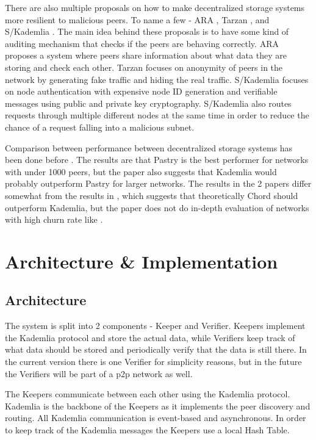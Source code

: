 \documentclass[ twoside,openright,titlepage,numbers=noenddot,headinclude,%
                footinclude=true,cleardoublepage=empty,abstractoff, %
                BCOR=5mm,paper=a4,fontsize=11pt,%
                ngerman,american,%
                ]{scrreprt}
\begin{document}
There are also multiple proposals on how to make decentralized storage systems more resilient to malicious peers.
To name a few - ARA \cite{ara}, Tarzan \cite{tarzan}, and S/Kademlia \cite{skademlia}.
The main idea behind these proposals is to have some kind of auditing mechanism that checks if the peers are behaving correctly.
ARA proposes a system where peers share information about what data they are storing and check each other.
Tarzan focuses on anonymity of peers in the network by generating fake traffic and hiding the real traffic.
S/Kademlia focuses on node authentication with expensive node ID generation and verifiable messages using
public and private key cryptography.
S/Kademlia also routes requests through multiple different nodes at the same time
in order to reduce the chance of a request falling into a malicious subnet.

Comparison between performance between decentralized storage systems has been done before
\cite{kadvschordvspastry, 2019AIPC.2129b0131A}.
The results are that Pastry is the best performer for networks with under 1000 peers, but the paper also suggests
that Kademlia would probably outperform Pastry for larger networks.
The results in the 2 papers differ somewhat from the results in \cite{compstudy}, which suggests that theoretically
Chord should outperform Kademlia, but the paper does not do in-depth evaluation of networks with high churn rate
like \cite{kadvschordvspastry}.

\chapter{Architecture \& Implementation}
\label{cha:arch-impl}

\section{Architecture}
\label{sec:architecture}

The system is split into 2 components - Keeper and Verifier.
Keepers implement the Kademlia protocol and store the actual data,
while Verifiers keep track of what data should be stored and periodically verify that the data is still there.
In the current version there is one Verifier for simplicity reasons,
but in the future the Verifiers will be part of a p2p network as well.

The Keepers communicate between each other using the Kademlia protocol.
Kademlia is the backbone of the Keepers as it implements the peer discovery and routing.
All Kademlia communication is event-based and asynchronous.
In order to keep track of the Kademlia messages the Keepers use a local Hash Table.
\end{document}
